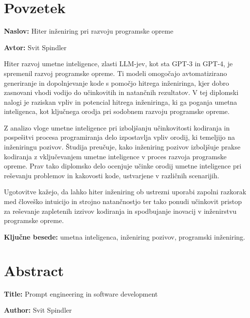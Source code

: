 \documentclass[a4paper,12pt,openright]{book}
\newcommand{\ttitle}{Hiter inženiring pri razvoju programske opreme}
\newcommand{\ttitleEn}{Prompt engineering in software development}
\newcommand{\tauthor}{Svit Spindler}
\newcommand{\tkeywords}{umetna inteligenca, inženiring pozivov, programski inženiring}
\newcommand{\clearemptydoublepage}{\newpage{\pagestyle{empty}\cleardoublepage}}
\begin{document}
\clearemptydoublepage

{}
\chapter*{Povzetek}

\noindent\textbf{Naslov:} \ttitle
\bigskip

\noindent\textbf{Avtor:} \tauthor
\bigskip

Hiter razvoj umetne inteligence, zlasti LLM-jev, kot sta GPT-3 in GPT-4, je spremenil razvoj programske opreme. Ti modeli omogočajo avtomatizirano generiranje in dopolnjevanje kode s pomočjo hitrega inženiringa, kjer dobro zasnovani vhodi vodijo do učinkovitih in natančnih rezultatov. V tej diplomski nalogi je raziskan vpliv in potencial hitrega inženiringa, ki ga poganja umetna inteligenca, kot ključnega orodja pri sodobnem razvoju programske opreme.

Z analizo vloge umetne inteligence pri izboljšanju učinkovitosti kodiranja in pospešitvi procesa programiranja delo izpostavlja vpliv orodij, ki temeljijo na inženiringu pozivov. Študija preučuje, kako inženiring pozivov izboljšuje prakse kodiranja z vključevanjem umetne inteligence v proces razvoja programske opreme. Prav tako diplomsko delo ocenjuje učinke orodij umetne inteligence pri reševanju problemov in kakovosti kode, ustvarjene v različnih scenarijih.

Ugotovitve kažejo, da lahko hiter inženiring ob ustrezni uporabi zapolni razkorak med človeško intuicijo in strojno natančnostjo ter tako ponudi učinkovit pristop za reševanje zapletenih izzivov kodiranja in spodbujanje inovacij v inženirstvu programske opreme.

\bigskip

\noindent\textbf{Ključne besede:} \tkeywords.
\clearemptydoublepage

{}
\chapter*{Abstract}

\noindent\textbf{Title:} \ttitleEn
\bigskip

\noindent\textbf{Author:} \tauthor
\bigskip
\end{document}
